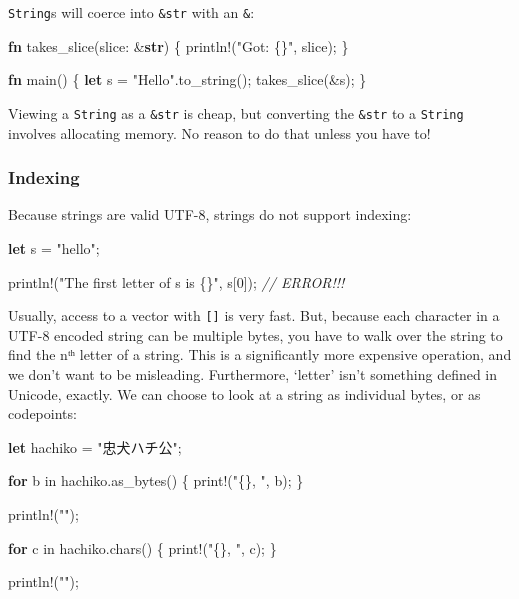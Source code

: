 \documentclass[a4paper,]{book}
\newenvironment{Shaded}{\begin{snugshade}}{\end{snugshade}}
\newcommand{\KeywordTok}[1]{\textcolor[rgb]{0.13,0.29,0.53}{\textbf{{#1}}}}
\newcommand{\DecValTok}[1]{\textcolor[rgb]{0.00,0.00,0.81}{{#1}}}
\newcommand{\StringTok}[1]{\textcolor[rgb]{0.31,0.60,0.02}{{#1}}}
\newcommand{\CommentTok}[1]{\textcolor[rgb]{0.56,0.35,0.01}{\textit{{#1}}}}
\newcommand{\OtherTok}[1]{\textcolor[rgb]{0.56,0.35,0.01}{{#1}}}
\newcommand{\NormalTok}[1]{{#1}}
\begin{document}
\texttt{String}s will coerce into \texttt{\&str} with an \texttt{\&}:

\begin{Shaded}
\begin{Highlighting}[]
\KeywordTok{fn} \NormalTok{takes_slice(slice: &}\KeywordTok{str}\NormalTok{) \{}
    \OtherTok{println!}\NormalTok{(}\StringTok{"Got: \{\}"}\NormalTok{, slice);}
\NormalTok{\}}

\KeywordTok{fn} \NormalTok{main() \{}
    \KeywordTok{let} \NormalTok{s = }\StringTok{"Hello"}\NormalTok{.to_string();}
    \NormalTok{takes_slice(&s);}
\NormalTok{\}}
\end{Highlighting}
\end{Shaded}

Viewing a \texttt{String} as a \texttt{\&str} is cheap, but converting
the \texttt{\&str} to a \texttt{String} involves allocating memory. No
reason to do that unless you have to!

\subsubsection{Indexing}\label{indexing}

Because strings are valid UTF-8, strings do not support indexing:

\begin{Shaded}
\begin{Highlighting}[]
\KeywordTok{let} \NormalTok{s = }\StringTok{"hello"}\NormalTok{;}

\OtherTok{println!}\NormalTok{(}\StringTok{"The first letter of s is \{\}"}\NormalTok{, s[}\DecValTok{0}\NormalTok{]); }\CommentTok{// ERROR!!!}
\end{Highlighting}
\end{Shaded}

Usually, access to a vector with \texttt{{[}{]}} is very fast. But,
because each character in a UTF-8 encoded string can be multiple bytes,
you have to walk over the string to find the nᵗʰ letter of a string.
This is a significantly more expensive operation, and we don't want to
be misleading. Furthermore, `letter' isn't something defined in Unicode,
exactly. We can choose to look at a string as individual bytes, or as
codepoints:

\begin{Shaded}
\begin{Highlighting}[]
\KeywordTok{let} \NormalTok{hachiko = }\StringTok{"忠犬ハチ公"}\NormalTok{;}

\KeywordTok{for} \NormalTok{b in hachiko.as_bytes() \{}
    \OtherTok{print!}\NormalTok{(}\StringTok{"\{\}, "}\NormalTok{, b);}
\NormalTok{\}}

\OtherTok{println!}\NormalTok{(}\StringTok{""}\NormalTok{);}

\KeywordTok{for} \NormalTok{c in hachiko.chars() \{}
    \OtherTok{print!}\NormalTok{(}\StringTok{"\{\}, "}\NormalTok{, c);}
\NormalTok{\}}

\OtherTok{println!}\NormalTok{(}\StringTok{""}\NormalTok{);}
\end{Highlighting}
\end{Shaded}
\end{document}
